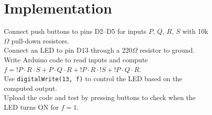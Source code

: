 \documentclass[12pt,a4paper]{article}
\begin{document}
\newpage

\begin{figure}[H]
  \centering
  \begin{minipage}[t]{0.48\textwidth}
    \section*{Implementation}
    \small
    Connect push buttons to pins D2–D5 for inputs $P$, $Q$, $R$, $S$ with 10k$\Omega$ pull-down resistors. \\
    
    Connect an LED to pin D13 through a 220$\Omega$ resistor to ground. \\
    
    Write Arduino code to read inputs and compute $f = {!}P \cdot R \cdot S + P \cdot Q \cdot R + {!}P \cdot R \cdot {!}S + {!}P \cdot Q \cdot R$. \\
    
    Use \texttt{digitalWrite(13, f)} to control the LED based on the computed output. \\
    
    Upload the code and test by pressing buttons to check when the LED turns ON for $f = 1$.
  \end{minipage}
  \hfill
  \begin{minipage}[t]{0.48\textwidth}
  \end{minipage}
\end{figure}
\end{document}

